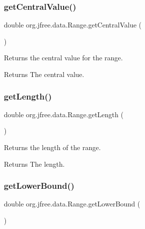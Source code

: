 \subsubsection{\texorpdfstring{get\+Central\+Value()}{getCentralValue()}}
{\footnotesize\ttfamily double org.\+jfree.\+data.\+Range.\+get\+Central\+Value (\begin{DoxyParamCaption}{ }\end{DoxyParamCaption})}

Returns the central value for the range.

\begin{DoxyReturn}{Returns}
The central value. 
\end{DoxyReturn}
\mbox{\label{classorg_1_1jfree_1_1data_1_1_range_aa67d9b07ecca735d9c21392a05600e85}} 
\subsubsection{\texorpdfstring{get\+Length()}{getLength()}}
{\footnotesize\ttfamily double org.\+jfree.\+data.\+Range.\+get\+Length (\begin{DoxyParamCaption}{ }\end{DoxyParamCaption})}

Returns the length of the range.

\begin{DoxyReturn}{Returns}
The length. 
\end{DoxyReturn}
\mbox{\label{classorg_1_1jfree_1_1data_1_1_range_ac27eb47cfe21aa447b525de3f01eac58}} 
\subsubsection{\texorpdfstring{get\+Lower\+Bound()}{getLowerBound()}}
{\footnotesize\ttfamily double org.\+jfree.\+data.\+Range.\+get\+Lower\+Bound (\begin{DoxyParamCaption}{ }\end{DoxyParamCaption})}

